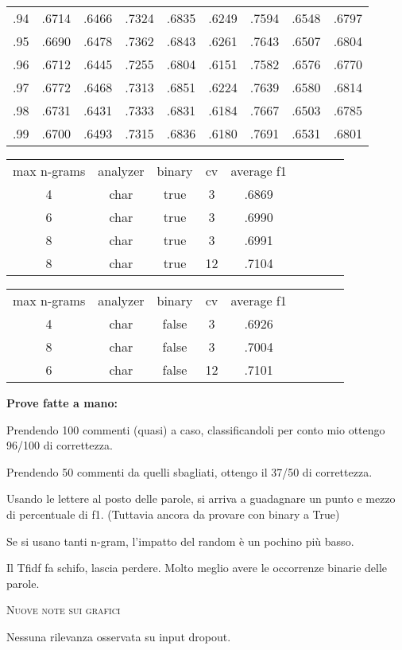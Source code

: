 \documentclass[a4paper,10pt]{article} %
\newcommand{\msection}[1]{%
    {\newpage\bigbreak \bigbreak \par \hfil \huge \textsc {#1}}\par}
\renewcommand{\b}[1]{%
    {\textbf{#1}}}
\begin{document}
\begin{tabular} {ccccccccc}
    .94  & .6714 & .6466 & .7324 & .6835 & .6249 & .7594 & .6548 & .6797  \\
    .95  & .6690 & .6478 & .7362 & .6843 & .6261 & .7643 & .6507 & .6804  \\
    .96  & .6712 & .6445 & .7255 & .6804 & .6151 & .7582 & .6576 & .6770  \\
    .97  & .6772 & .6468 & .7313 & .6851 & .6224 & .7639 & .6580 & .6814  \\
    .98  & .6731 & .6431 & .7333 & .6831 & .6184 & .7667 & .6503 & .6785  \\
    .99  & .6700 & .6493 & .7315 & .6836 & .6180 & .7691 & .6531 & .6801  \\
\end{tabular} 

\begin{tabular} {ccccccccc}
max n-grams & analyzer & binary & cv & average f1 \\
    4       &  char    & true  & 3  & .6869 \\
    6       &  char    & true  & 3  & .6990 \\
    8       &  char    & true  & 3  & .6991 \\
    8       &  char    & true  & 12  & .7104 \\
\end{tabular} 

\begin{tabular} {ccccccccc}
max n-grams & analyzer & binary & cv & average f1 \\
    4       &  char    & false  & 3  & .6926 \\
    8       &  char    & false  & 3  & .7004 \\
    6       &  char    & false  & 12  & .7101 \\
\end{tabular} 

\b{Prove fatte a mano:}

Prendendo 100 commenti (quasi) a caso, classificandoli per conto mio ottengo 96/100 di correttezza.

Prendendo 50 commenti da quelli sbagliati, ottengo il 37/50 di correttezza.

Usando le lettere al posto delle parole, si arriva a guadagnare un punto e mezzo di percentuale di f1. (Tuttavia ancora da provare con binary a True)

Se si usano tanti n-gram, l'impatto del random è un pochino più basso.

Il Tfidf fa schifo, lascia perdere. Molto meglio avere le occorrenze binarie delle parole.


\msection{Nuove note sui grafici }

Nessuna rilevanza osservata su input dropout. 
\end{document}
